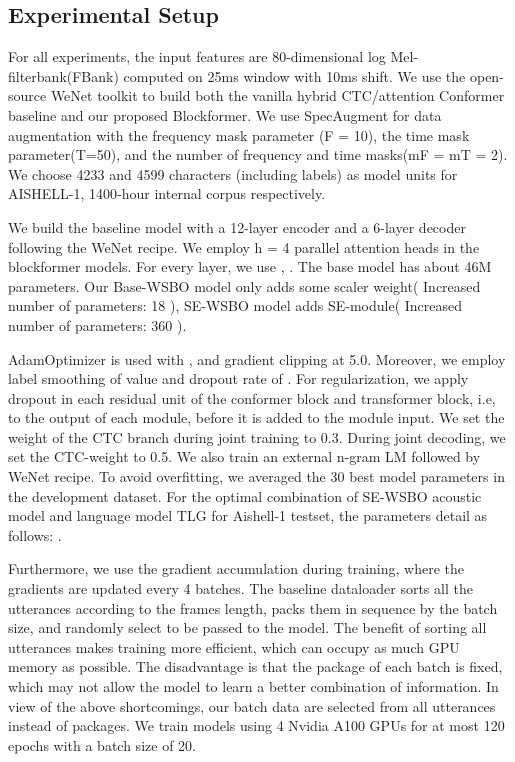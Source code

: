 \documentclass[a4paper]{article}
\begin{document}
\subsection{Experimental Setup}
For all experiments, the input features are 80-dimensional
log Mel-filterbank(FBank) computed on 25ms window with
10ms shift. We use the open-source WeNet toolkit\cite{Yao2021WeNetPO} to build both the vanilla hybrid CTC/attention Conformer baseline and our proposed Blockformer. We use SpecAugment\cite{2019,Park2020SpecaugmentOL} for data augmentation with the frequency mask parameter (F = 10), the time mask parameter(T=50), and the number of frequency and time masks(mF = mT = 2). We choose 4233 and 4599 characters (including  labels) as model units for
AISHELL-1, 1400-hour internal corpus respectively. 
 

We build the baseline model with a 12-layer encoder and
a 6-layer decoder following the WeNet recipe\cite{Yao2021WeNetPO}.
We employ h = 4 parallel attention heads in the blockformer models. For every layer, we use ,  . The base model has about 46M parameters. Our Base-WSBO model only adds some scaler weight( Increased number of parameters: 18 ), SE-WSBO model adds SE-module( Increased number of parameters: 360 ).

AdamOptimizer\cite{Vaswani2017AttentionIA} is used 
with , and gradient
clipping at 5.0. Moreover, we employ label smoothing of value \cite{Szegedy2016RethinkingTI} and dropout rate of .
For regularization, we apply dropout \cite{Srivastava2014DropoutAS} in each residual unit of the conformer block and transformer block, i.e, to the output of each module, before it is added to the module input. We set the weight  of the CTC branch during joint training to 0.3. During joint decoding, we set the CTC-weight  to 0.5. We also train an external n-gram LM followed by WeNet recipe\cite{Yao2021WeNetPO}. To avoid overfitting, we averaged the 30 best model parameters in the development dataset. For the optimal combination of SE-WSBO acoustic model and language model TLG for Aishell-1 testset, the parameters detail as follows: .

Furthermore, we use the gradient accumulation\cite{Hermans2017AccumulatedGN,gradient-accumulation} during training, where the gradients are updated every 4 batches.
The baseline dataloader sorts all the utterances according to the frames length, packs them in sequence by the batch size, and randomly select to be passed to the model. The benefit of sorting all utterances makes training more efficient, which can occupy as much GPU memory as possible. The disadvantage is that the package of each batch is fixed, which may not allow the model to learn a better combination of information. In view of the above shortcomings, our batch data are selected from all utterances instead of packages. We train models using 4 Nvidia A100 GPUs for at most 120 epochs with a batch size of 20. 
\end{document}
